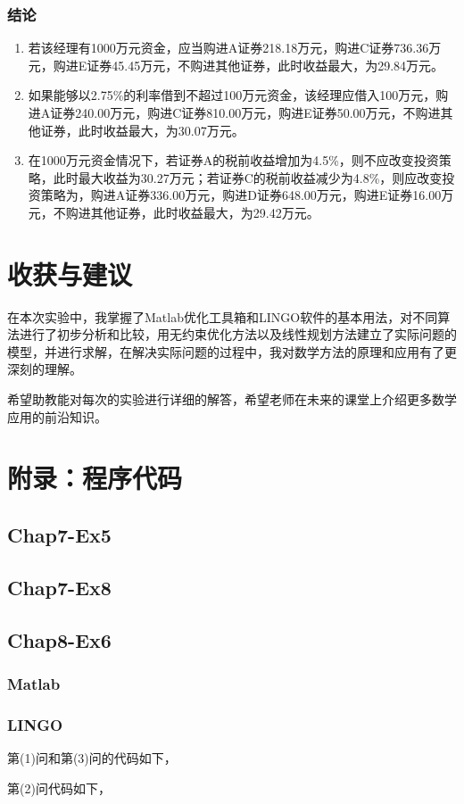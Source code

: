 \documentclass[12pt,a4paper]{article}
\begin{document}
\subsubsection{结论}

\begin{enumerate}
    \item 若该经理有1000万元资金，应当购进A证券218.18万元，购进C证券736.36万元，购进E证券45.45万元，不购进其他证券，此时收益最大，为29.84万元。
    \item 如果能够以2.75\%的利率借到不超过100万元资金，该经理应借入100万元，购进A证券240.00万元，购进C证券810.00万元，购进E证券50.00万元，不购进其他证券，此时收益最大，为30.07万元。
    \item 在1000万元资金情况下，若证券A的税前收益增加为4.5\%，则不应改变投资策略，此时最大收益为30.27万元；若证券C的税前收益减少为4.8\%，则应改变投资策略为，购进A证券336.00万元，购进D证券648.00万元，购进E证券16.00万元，不购进其他证券，此时收益最大，为29.42万元。
\end{enumerate}

\section{收获与建议}

在本次实验中，我掌握了Matlab优化工具箱和LINGO软件的基本用法，对不同算法进行了初步分析和比较，用无约束优化方法以及线性规划方法建立了实际问题的模型，并进行求解，在解决实际问题的过程中，我对数学方法的原理和应用有了更深刻的理解。

希望助教能对每次的实验进行详细的解答，希望老师在未来的课堂上介绍更多数学应用的前沿知识。

\section{附录：程序代码}

\subsection{Chap7-Ex5}\label{sec:ex5_code}



\subsection{Chap7-Ex8}\label{sec:ex8_code}



\subsection{Chap8-Ex6}\label{sec:ex6_code}

\subsubsection{Matlab}



\subsubsection{LINGO}

第(1)问和第(3)问的代码如下，


第(2)问代码如下，

\end{document}

